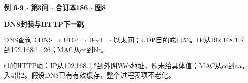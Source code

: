 {\color{ink}\bfseries 例 6-9 \(\cdot \) 第3问 \(\cdot \) 合订本186 \(\cdot \) 图8}\par \textbf{DNS封装与HTTP下一跳}\par\vspace{2bp}DNS查询：DNS\(\to \)UDP\(\to \)IPv4\(\to \)以太网；UDP目的端口53。IP从192.168.1.2到192.168.1.126；MAC从cc到bb。\par t1的HTTP帧：IP从192.168.1.2到外网Web地址，题未给具体值；MAC从cc到aa，入4出2。假设DNS已有有效缓存，整个过程表项不老化。
